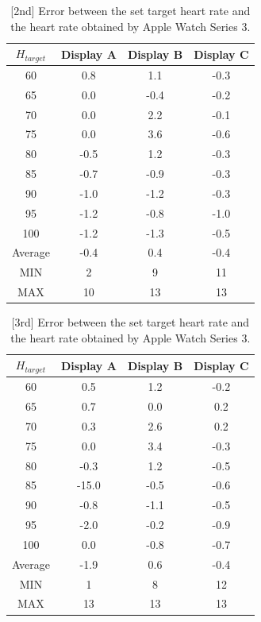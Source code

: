 \documentclass[sigchi,authordraft]{acmart}
\begin{document}
\begin{table}[!t]
  \centering
  \caption{[2nd] Error between the set target heart rate and the heart rate obtained by Apple Watch Series 3.}
  \begin{tabular}{c|c|c|c} \hline\hline
    $H_{target}$ & Display A & Display B & Display C \\ \hline
    60 & 0.8 & 1.1 & -0.3 \\
    65 & 0.0 & -0.4 & -0.2 \\
    70 & 0.0 & 2.2 & -0.1 \\
    75 & 0.0 & 3.6 & -0.6 \\
    80 & -0.5 & 1.2 & -0.3 \\
    85 & -0.7 & -0.9 & -0.3 \\
    90 & -1.0 & -1.2 & -0.3 \\
    95 & -1.2 & -0.8 & -1.0 \\
    100 & -1.2 & -1.3 & -0.5 \\ \hline
    Average & -0.4 & 0.4 & -0.4 \\ \hline \hline
    MIN & 2 & 9 & 11 \\ \hline
    MAX & 10 & 13 & 13 \\ \hline
  \end{tabular}
  \label{tab:series3_result_2nd}
\end{table}

\begin{table}[!t]
  \centering
  \caption{[3rd] Error between the set target heart rate and the heart rate obtained by Apple Watch Series 3.}
  \begin{tabular}{c|c|c|c} \hline\hline
    $H_{target}$ & Display A & Display B & Display C \\ \hline
    60 & 0.5 & 1.2 & -0.2 \\
    65 & 0.7 & 0.0 & 0.2 \\
    70 & 0.3 & 2.6 & 0.2 \\
    75 & 0.0 & 3.4 & -0.3 \\
    80 & -0.3 & 1.2 & -0.5 \\
    85 & -15.0 & -0.5 & -0.6 \\
    90 & -0.8 & -1.1 & -0.5 \\
    95 & -2.0 & -0.2 & -0.9 \\
    100 & 0.0 & -0.8 & -0.7 \\ \hline
    Average & -1.9 & 0.6 & -0.4 \\ \hline \hline
    MIN & 1 & 8 & 12 \\ \hline
    MAX & 13 & 13 & 13 \\ \hline
  \end{tabular}
  \label{tab:series3_result_3rd}
\end{table}
\end{document}
